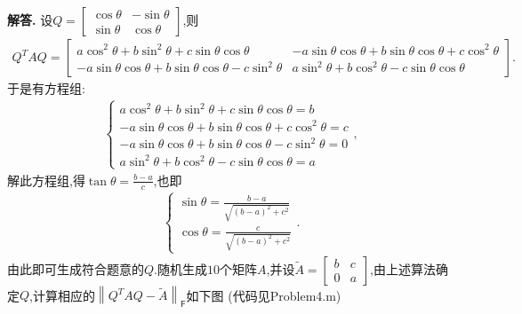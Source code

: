 \documentclass[12pt, a4paper, oneside, UTF8]{ctexart}
\newenvironment{solution}{\par\noindent\textbf{解答. }}{\par}
\begin{document}
\begin{solution}
    设$Q=\left[ \begin{array}{cc} \cos{\theta} & -\sin{\theta} \\ \sin{\theta} & \cos{\theta} \end{array} \right]$,则
    \begin{align*}
        Q^{T}AQ = \left[ 
            \begin{array}{cc} 
                a\cos^2{\theta}+b\sin^2{\theta}+c\sin{\theta}\cos{\theta} & -a\sin{\theta}\cos{\theta}+b\sin{\theta}\cos{\theta}+c\cos^2{\theta} \\ 
                -a\sin{\theta}\cos{\theta}+b\sin{\theta}\cos{\theta}-c\sin^2{\theta} & a\sin^2{\theta}+b\cos^2{\theta}-c\sin{\theta}\cos{\theta}
            \end{array} 
        \right] .
    \end{align*}
    于是有方程组:
    \begin{align*}
        \left\{
            \begin{array}{llll}
                a\cos^2{\theta}+b\sin^2{\theta}+c\sin{\theta}\cos{\theta} = b \\
                -a\sin{\theta}\cos{\theta}+b\sin{\theta}\cos{\theta}+c\cos^2{\theta} = c \\
                -a\sin{\theta}\cos{\theta}+b\sin{\theta}\cos{\theta}-c\sin^2{\theta} = 0 \\
                a\sin^2{\theta}+b\cos^2{\theta}-c\sin{\theta}\cos{\theta} = a
            \end{array}
        \right. ,
    \end{align*}
    解此方程组,得$\tan{\theta} = \frac{b-a}{c}$,也即
    \begin{align*}
        \left\{
            \begin{array}{ll}
                \sin{\theta} = \frac{b-a}{\sqrt{(b-a)^2+c^2}} \\
                \cos{\theta} = \frac{c}{\sqrt{(b-a)^2+c^2}}
            \end{array}
        \right. .
    \end{align*}
    由此即可生成符合题意的$Q$.随机生成$10$个矩阵$A$,并设$\tilde{A} = \left[ \begin{array}{cc} b & c \\ 0 & a \end{array} \right]$,由上述算法确定$Q$,计算相应的${\left\lVert{Q^{T}AQ-\tilde{A}}\right\rVert}_{\mathsf{F}}$如下图
    (代码见Problem4.m)
    \begin{figure}[htbp] %

\end{figure}
\end{solution}
\end{document}
